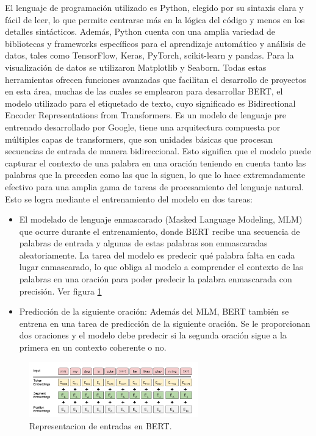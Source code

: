 El lenguaje de programación utilizado es Python, elegido por su sintaxis clara y fácil de leer, lo que permite centrarse más en la lógica del código y menos en los detalles sintácticos. Además, Python cuenta con una amplia variedad de bibliotecas y frameworks específicos para el aprendizaje automático y análisis de datos, tales como TensorFlow, Keras, PyTorch, scikit-learn y pandas. Para la visualización de datos se utilizaron Matplotlib y Seaborn. Todas estas herramientas ofrecen funciones avanzadas que facilitan el desarrollo de proyectos en esta área, muchas de las cuales se emplearon para desarrollar BERT, el modelo utilizado para el etiquetado de texto, cuyo significado es Bidirectional Encoder Representations from Transformers. Es un modelo de lenguaje pre entrenado desarrollado por Google, tiene una arquitectura compuesta por múltiples capas de transformers, que son unidades básicas que procesan secuencias de entrada de manera bidireccional. Esto significa que el modelo puede capturar el contexto de una palabra en una oración teniendo en cuenta tanto las palabras que la preceden como las que la siguen, lo que lo hace extremadamente efectivo para una amplia gama de tareas de procesamiento del lenguaje natural. Esto se logra mediante el entrenamiento del modelo en dos tareas: 

\begin{itemize}
\item El modelado de lenguaje enmascarado (Masked Language Modeling, MLM) que ocurre durante el entrenamiento, donde BERT recibe una secuencia de palabras de entrada y algunas de estas palabras son enmascaradas aleatoriamente. La tarea del modelo es predecir qué palabra falta en cada lugar enmascarado, lo que obliga al modelo a comprender el contexto de las palabras en una oración para poder predecir la palabra enmascarada con precisión. Ver figura \ref{fig:nlp8}

\item Predicción de la siguiente oración: Además del MLM, BERT también se entrena en una tarea de predicción de la siguiente oración. Se le proporcionan dos oraciones y el modelo debe predecir si la segunda oración sigue a la primera en un contexto coherente o no.
\end{itemize}

\begin{figure}
	\includegraphics[width=0.65\textwidth]{capitulo3/figuras/nlp8.png}
	\caption{Representacion de entradas en BERT.}
	\label{fig:nlp8}
\end{figure}

